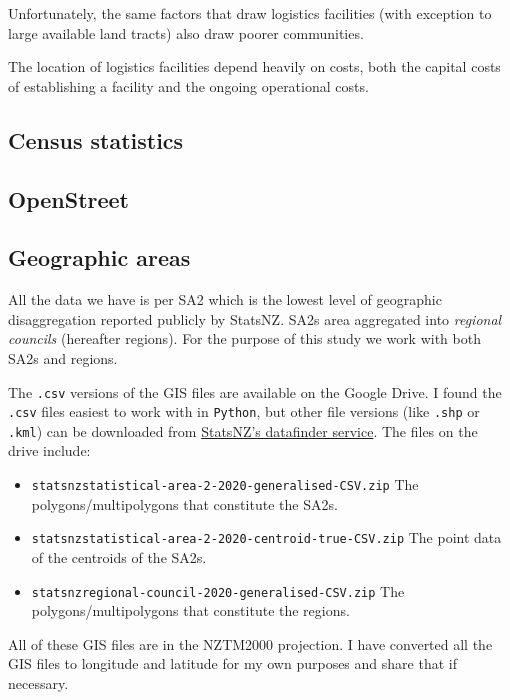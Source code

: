 \documentclass[3p, a4paper, authoryear, 11pt, fleqn, review]{elsarticle}
\newcommand{\nmt}[1]{{\color{red}{~(nmt: #1)}}}
\begin{document}
Unfortunately, the same factors that draw logistics facilities (with exception to large available land tracts) also draw poorer communities. 

\nmt{NADIA CONTINUE HERE}


The location of logistics facilities depend heavily on costs, both the capital costs of establishing a facility and the ongoing operational costs. 

\subsection{Census statistics}
\subsection{OpenStreet}

\subsection{Geographic areas}




All the data we have is per \ac{SA2} which is the lowest level of geographic disaggregation reported publicly by StatsNZ. \acp{SA2} area aggregated into \emph{regional councils} (hereafter regions). For the purpose of this study we work with both \acp{SA2} and regions. 

The \texttt{.csv} versions of the GIS files are available on the Google Drive. I found the \texttt{.csv} files easiest to work with in \texttt{Python}, but other file versions (like \texttt{.shp} or \texttt{.kml}) can be downloaded from \href{https://datafinder.stats.govt.nz/}{StatsNZ's datafinder service}. The files on the drive include:
\begin{itemize}
\item \texttt{statsnzstatistical-area-2-2020-generalised-CSV.zip} The polygons/multipolygons that constitute the \acp{SA2}. 
\item \texttt{statsnzstatistical-area-2-2020-centroid-true-CSV.zip} The point data of the centroids of the \acp{SA2}. 
\item \texttt{statsnzregional-council-2020-generalised-CSV.zip} The polygons/multipolygons that constitute the regions. 
\end{itemize}

All of these GIS files are in the \ac{NZTM2000} projection. I have converted all the GIS files to longitude and latitude for my own purposes and share that if necessary. 
\end{document}
